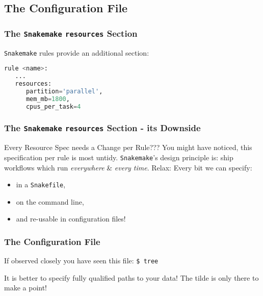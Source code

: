 \subsection{The Configuration File}

\begin{frame}[fragile]
  \frametitle{The \texttt{Snakemake} \texttt{resources} Section}
  \texttt{Snakemake} rules provide an additional  section:
  \begin{lstlisting}[language=Python,style=Python]
rule <name>:
   ...
   resources:
      partition='parallel',
      mem_mb=1800,
      cpus_per_task=4
  \end{lstlisting}
  \pause
\end{frame}

\begin{frame}
  \frametitle{The \texttt{Snakemake} \texttt{resources} Section - its Downside}
  \begin{alertblock}{Every Resource Spec needs a Change per Rule???}
   You might have noticed, this specification per rule is most untidy. \texttt{Snakemake}'s design principle is: ship workflows which run \emph{everywhere} \& \emph{every time}.
   \newline \pause
   Relax: Every bit we can specify:
   \begin{itemize}
    \item in a \texttt{Snakefile},
    \item on the command line,
    \item and re-usable in configuration files!
   \end{itemize}

  \end{alertblock}

\end{frame} 

\begin{frame}
  \frametitle{The Configuration File}
  If observed closely you have seen this file:\newline
            {\tiny \DTsetlength{0.2em}{1em}{0.2em}{0.4pt}{.6pt}
\texttt{\$ tree}
}
 \pause
 \pause
 \begin{warning}
 	It is better to specify fully qualified paths to your data! The tilde is only there to make a point!
 \end{warning}
\end{frame}

